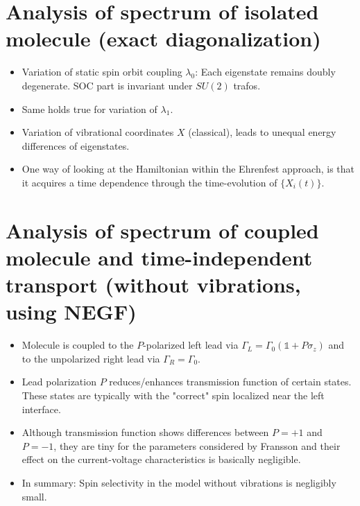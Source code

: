 \documentclass{article}
\begin{document}
\section{Analysis of spectrum of isolated molecule (exact diagonalization)}
\begin{itemize}
	\item Variation of static spin orbit coupling $\lambda_0$: Each eigenstate remains doubly degenerate. SOC part is invariant under $SU(2)$ trafos.
	\item Same holds true for variation of $\lambda_1$. 
	\item Variation of vibrational coordinates $X$ (classical), leads to unequal energy differences of eigenstates. 
	\item One way of looking at the Hamiltonian within the Ehrenfest approach, is that it acquires a time dependence through the time-evolution of $\{X_i(t)\}$. 
\end{itemize}
\section{Analysis of spectrum of coupled molecule and time-independent transport (without vibrations, using NEGF)}
\begin{itemize}
	\item Molecule is coupled to the $P$-polarized left lead via $\Gamma_L = \Gamma_0 (\mathds{1}+P\sigma_z)$ and to the unpolarized right lead via $\Gamma_R=\Gamma_0$. 
	\item Lead polarization $P$ reduces/enhances transmission function of certain states. These states are typically with the "correct" spin localized near the left interface. 
	\item Although transmission function shows differences between $P=+1$ and $P=-1$, they are tiny for the parameters considered by Fransson and their effect on the current-voltage characteristics is basically negligible.
	\item In summary: Spin selectivity in the model without vibrations is negligibly small. 
\end{itemize}
\end{document}
